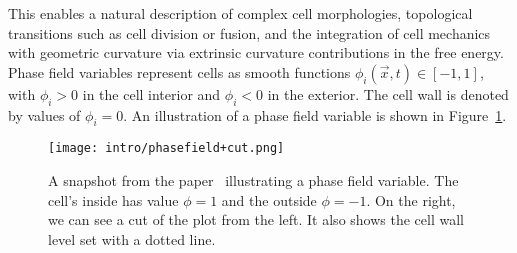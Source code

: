 This enables a natural description of complex cell morphologies, topological transitions such as cell division or fusion, and the integration of cell mechanics with geometric curvature via extrinsic curvature contributions in the free energy. \\
Phase field variables represent cells as smooth functions $\phi_i(\vec{x}, t) \in [-1, 1]$, with $\phi_i > 0$ in the cell interior and $\phi_i <0$ in the exterior. 
The cell wall is denoted by values of $\phi_i = 0$. 
An illustration of a phase field variable is shown in Figure~\ref{fig:phasefield}. \\
\begin{figure}[h!]
	\centering
	\texttt{[image: intro/phasefield+cut.png]}
	\caption{A snapshot from the paper~\cite{alert2020} illustrating a phase field variable. 
	The cell's inside has value $\phi = 1$ and the outside $\phi = -1$. 
	On the right, we can see a cut of the plot from the left. 
	It also shows the cell wall level set with a dotted line. 
	}
	\label{fig:phasefield}
\end{figure}


